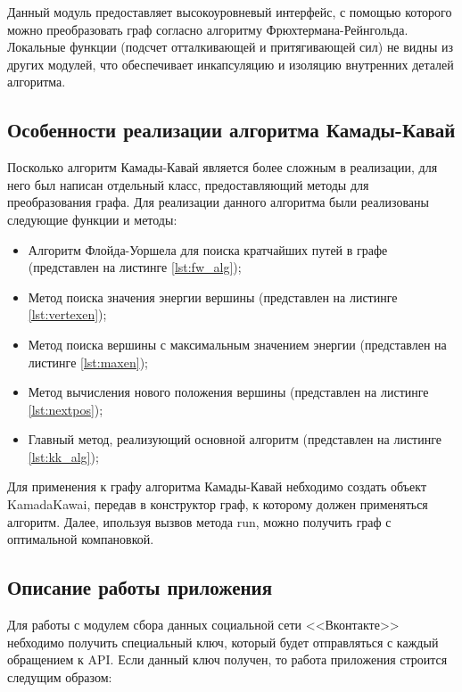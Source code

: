 \documentclass[14pt, russian]{scrartcl}
\begin{document}
Данный модуль предоставляет высокоуровневый интерфейс, с помощью которого можно преобразовать граф согласно алгоритму Фрюхтермана-Рейнгольда. Локальные функции (подсчет отталкивающей и притягивающей сил) не видны из других модулей, что обеспечивает инкапсуляцию и изоляцию внутренних деталей алгоритма.
 


\subsection{Особенности реализации алгоритма Камады-Кавай}

Посколько алгоритм Камады-Кавай является более сложным в реализации, для него был написан отдельный класс, предоставляющий методы для преобразования графа. Для реализации данного алгоритма были реализованы следующие функции и методы:

\begin{itemize}
  \item Алгоритм Флойда-Уоршела для поиска кратчайших путей в графе (представлен на листинге \ref{lst:fw_alg});
  \item Метод поиска значения энергии вершины (представлен на листинге \ref{lst:vertexen});
  \item Метод поиска вершины с максимальным значением энергии (представлен на листинге \ref{lst:maxen});
  \item Метод вычисления нового положения вершины (представлен на листинге \ref{lst:nextpos});
  \item Главный метод, реализующий основной алгоритм (представлен на листинге \ref{lst:kk_alg});
\end{itemize}

Для применения к графу алгоритма Камады-Кавай небходимо создать объект KamadaKawai, передав в конструктор граф, к которому должен применяться алгоритм. Далее,
ипользуя вызвов метода run, можно получить граф с оптимальной компановкой.



\subsection{Описание работы приложения}

Для работы с модулем сбора данных социальной сети <<Вконтакте>> небходимо получить специальный ключ, который будет отправляться с каждый обращением к API. Если данный ключ получен, то работа приложения строится следущим образом:
\end{document}
